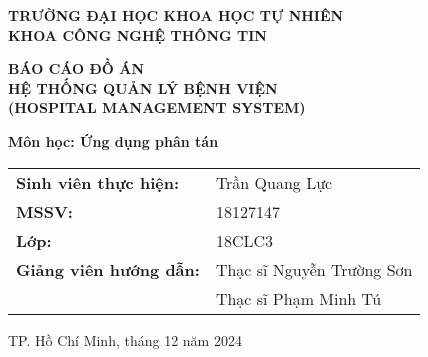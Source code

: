 \documentclass[12pt,a4paper]{report}
\begin{document}
\begin{titlepage}
    \centering
    \vspace*{1cm}
    
    {\Large\textbf{TRƯỜNG ĐẠI HỌC KHOA HỌC TỰ NHIÊN}}\\
    {\Large\textbf{KHOA CÔNG NGHỆ THÔNG TIN}}\\
    \vspace{1cm}
    \vspace{1cm}
    
    {\huge\textbf{BÁO CÁO ĐỒ ÁN}}\\
    \vspace{0.5cm}
    {\Large\textbf{HỆ THỐNG QUẢN LÝ BỆNH VIỆN}}\\
    {\Large\textbf{(HOSPITAL MANAGEMENT SYSTEM)}}\\
    \vspace{1cm}
    
    {\large\textbf{Môn học: Ứng dụng phân tán}}\\
    \vspace{2cm}
    
    \begin{tabular}{ll}
    	\textbf{Sinh viên thực hiện:} & Trần Quang Lực \\
    	\textbf{MSSV:} & 18127147 \\
    	\textbf{Lớp:} & 18CLC3 \\
    	\textbf{Giảng viên hướng dẫn:} & Thạc sĩ Nguyễn Trường Sơn \\
    & Thạc sĩ Phạm Minh Tú \\
    \end{tabular}
    
    \vfill
    {\large TP. Hồ Chí Minh, tháng 12 năm 2024}
\end{titlepage}
\end{document}
